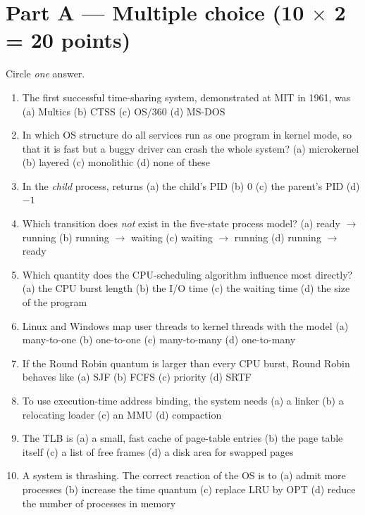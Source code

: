 \section*{Part A --- Multiple choice \hfill (10 $\times$ 2 = 20 points)}
Circle \emph{one} answer.
\begin{enumerate}[leftmargin=2.0em,label=A\arabic*.,itemsep=0.15em]
  \item The first successful time-sharing system, demonstrated at MIT in 1961, was \quad (a) Multics \quad (b) CTSS \quad (c) OS/360 \quad (d) MS-DOS
  \item In which OS structure do all services run as one program in kernel mode, so that it is fast but a buggy driver can crash the whole system? \quad (a) microkernel \quad (b) layered \quad (c) monolithic \quad (d) none of these
  \item In the \emph{child} process,  returns \quad (a) the child's PID \quad (b) $0$ \quad (c) the parent's PID \quad (d) $-1$
  \item Which transition does \emph{not} exist in the five-state process model? \quad (a) ready $\to$ running \quad (b) running $\to$ waiting \quad (c) waiting $\to$ running \quad (d) running $\to$ ready
  \item Which quantity does the CPU-scheduling algorithm influence most directly? \quad (a) the CPU burst length \quad (b) the I/O time \quad (c) the waiting time \quad (d) the size of the program
  \item Linux and Windows map user threads to kernel threads with the model \quad (a) many-to-one \quad (b) one-to-one \quad (c) many-to-many \quad (d) one-to-many
  \item If the Round Robin quantum is larger than every CPU burst, Round Robin behaves like \quad (a) SJF \quad (b) FCFS \quad (c) priority \quad (d) SRTF
  \item To use execution-time address binding, the system needs \quad (a) a linker \quad (b) a relocating loader \quad (c) an MMU \quad (d) compaction
  \item The TLB is \quad (a) a small, fast cache of page-table entries \quad (b) the page table itself \quad (c) a list of free frames \quad (d) a disk area for swapped pages
  \item A system is thrashing. The correct reaction of the OS is to \quad (a) admit more processes \quad (b) increase the time quantum \quad (c) replace LRU by OPT \quad (d) reduce the number of processes in memory
\end{enumerate}

